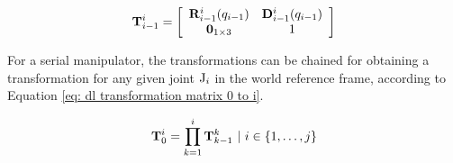 \begin{equation}\label{eq: dl transformation matrix i-1 to i}
	\mathrm{\mathbf{T}}_{i-1}^{i} = 
	\left[
	\begin{array}{cc}
		\mathrm{\mathbf{R}}_{i-1}^{i}(q_{i-1}) & \mathrm{\mathbf{D}}_{i-1}^{i}(q_{i-1}) \\
		\mathrm{\mathbf{0}}_{1\times3} & 1
	\end{array}
	\right]
\end{equation}

For a serial manipulator, the transformations can be chained for obtaining a transformation for any given joint $\mathrm{J}_{i}$ in the world reference frame, according to Equation \ref{eq: dl transformation matrix 0 to i}.

\begin{equation}\label{eq: dl transformation matrix 0 to i}
	\mathrm{\mathbf{T}}^i_0 = \displaystyle\prod_{k=1}^{i}\mathrm{\mathbf{T}}_{k-1}^{k}~|~i \in \{1, \hdots, j\}
\end{equation}